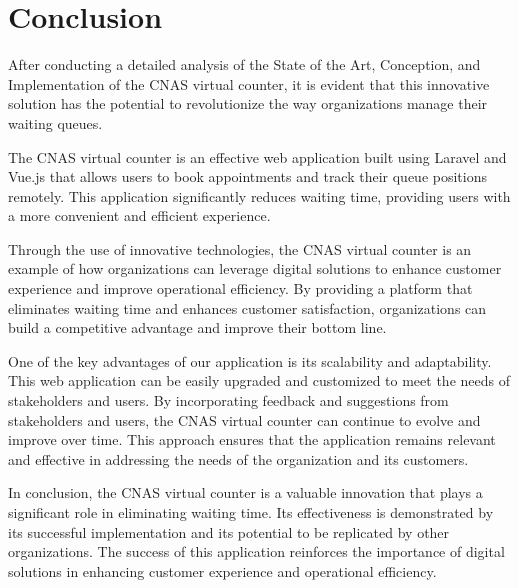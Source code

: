 \chapter*{Conclusion}
After conducting a detailed analysis of the State of the Art, Conception, and Implementation of the CNAS virtual counter, it is evident that this innovative solution has the potential to revolutionize the way organizations manage their waiting queues.

The CNAS virtual counter is an effective web application built using Laravel and Vue.js that allows users to book appointments and track their queue positions remotely. This application significantly reduces waiting time, providing users with a more convenient and efficient experience.

Through the use of innovative technologies, the CNAS virtual counter is an example of how organizations can leverage digital solutions to enhance customer experience and improve operational efficiency. By providing a platform that eliminates waiting time and enhances customer satisfaction, organizations can build a competitive advantage and improve their bottom line.

One of the key advantages of our application is its scalability and adaptability. This web application can be easily upgraded and customized to meet the needs of stakeholders and users. By incorporating feedback and suggestions from stakeholders and users, the CNAS virtual counter can continue to evolve and improve over time. This approach ensures that the application remains relevant and effective in addressing the needs of the organization and its customers.


In conclusion, the CNAS virtual counter is a valuable innovation that plays a significant role in eliminating waiting time. Its effectiveness is demonstrated by its successful implementation and its potential to be replicated by other organizations. The success of this application reinforces the importance of digital solutions in enhancing customer experience and operational efficiency.
